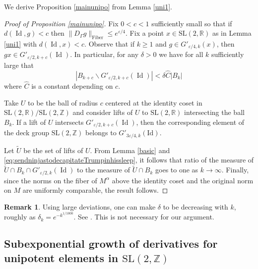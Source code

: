 \documentclass[10pt,reqno]{amsart}
\theoremstyle{Theorem}
\theoremstyle{definition}
\newtheorem{remark}[theorem]{Remark}
\theoremstyle{remark}
\renewcommand{\epsilon}{\varepsilon}
\DeclareMathOperator{\Id}{Id}
\newcommand{\sm}{\smallsetminus}
\newcommand{\R}{\mathbb {R}}
\newcommand{\Z}{\mathbb {Z}}
\newcommand{\e}{\epsilon}
\newcommand{\Sl}{\mathrm{SL}}
\newcommand{\id}{\mathrm{Id}}
\def\blue{}
\begin{document}
We derive Proposition \ref{mainunipo} from Lemma \ref{uni1}.
\begin{proof}[Proof of Proposition \ref{mainunipo}]
Fix $0<c<1$ sufficiently small so that if $d(\Id,g)<c$ then $\|D_{\Gamma} g\|_{\text{Fiber}}\le e^{\epsilon/4}$.
Fix a point $x\in \Sl(2,\R)$  as in   Lemma \ref{uni1} with $d(\Id, x)<c$.
Observe that if $k\ge 1$ and $g \in G'_{ \epsilon/4,k}(x)$, then $gx \in G'_{\e/2,k+c}(\Id)$.
In particular, for any $\delta>0$  we have  for all $k$ sufficiently large that %
\begin{equation}\label{eq:sendninjastodecapitateTrumpinhissleep} |B_{k+c}\sm G'_{\e/2, k+c}(\Id)| < \delta \hat C |B_k|\end{equation} where $\hat C$ is a constant depending on $c$.

Take  $U$ to be the ball of radius $c$ centered at  the identity coset in $\Sl(2,\R)/\Sl(2,\Z)$ and consider   lifts of $U$ to $\Sl(2,\R)$ intersecting the ball $B_k$. If a lift of $U$ intersects $G'_{\e/2, k+ c}(\Id)$, then the corresponding element of the deck group $\Sl(2, \Z)$ belongs to $G'_{3\e/4,k}(\id)$.



{\blue Let $\tilde U$ be the set of lifts of $U$.  From Lemma  \ref{basic} and \eqref{eq:sendninjastodecapitateTrumpinhissleep}, it follows
that ratio of the measure of $\tilde{U} \cap B_k \cap  G'_{\e/2, k}(\Id)$ to the measure of $\tilde{U} \cap B_k$ goes to one as $k \to \infty$.}
Finally, since the norms on the fiber of $M^\alpha$ above the identity coset and the original norm on $M$ are uniformly comparable,  the   result follows.
\end{proof}


\begin{remark} Using large deviations, one can   make $\delta$ to be decreasing with $k$,  roughly as $\delta_{k} = e^{-k^{1/1000}} $.   See \cite{MR2247652, MR2787598}.  This is not necessary for our argument.
\end{remark}


\subsection{Subexponential growth of derivatives for unipotent elements in $\Sl(2,\Z)$}\label{sec:mutualmastication}
\end{document}
